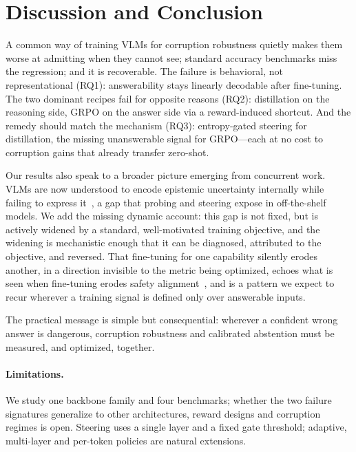 \documentclass[10pt,twocolumn,letterpaper]{article}
\begin{document}
\section{Discussion and Conclusion}
\label{sec:conclusion}

A common way of training VLMs for corruption robustness quietly makes them worse at
admitting when they cannot see; standard accuracy benchmarks miss the regression; and it
is recoverable. The failure is behavioral, not representational (RQ1): answerability
stays linearly decodable after fine-tuning. The two dominant recipes fail for opposite
reasons (RQ2): distillation on the reasoning side, GRPO on the answer side via a
reward-induced shortcut. And the remedy should match the mechanism (RQ3): entropy-gated
steering for distillation, the missing unanswerable signal for GRPO---each at no cost to
corruption gains that already transfer zero-shot.

Our results also speak to a broader picture emerging from concurrent work. VLMs are now
understood to encode epistemic uncertainty internally while failing to express
it~\cite{pramono2026trapsbench,he2026knowing,chandu2025certainly}, a gap that probing and
steering expose in off-the-shelf models. We add the missing dynamic account: this gap is
not fixed, but is actively widened by a standard, well-motivated training objective, and
the widening is mechanistic enough that it can be diagnosed, attributed to the objective,
and reversed. That fine-tuning for one capability silently erodes another, in a direction
invisible to the metric being optimized, echoes what is seen when fine-tuning erodes
safety alignment~\cite{qi2024finetuning}, and is a pattern we expect to recur wherever a
training signal is defined only over answerable inputs.

The practical message is simple but consequential: wherever a confident wrong answer is
dangerous, corruption robustness and calibrated abstention must be measured, and
optimized, together.

\paragraph{Limitations.}
We study one backbone family and four benchmarks; whether the two failure signatures
generalize to other architectures, reward designs and corruption regimes is open.
Steering uses a single layer and a fixed gate threshold; adaptive, multi-layer and
per-token policies are natural extensions.

{
    \small
    
    
}
\end{document}
